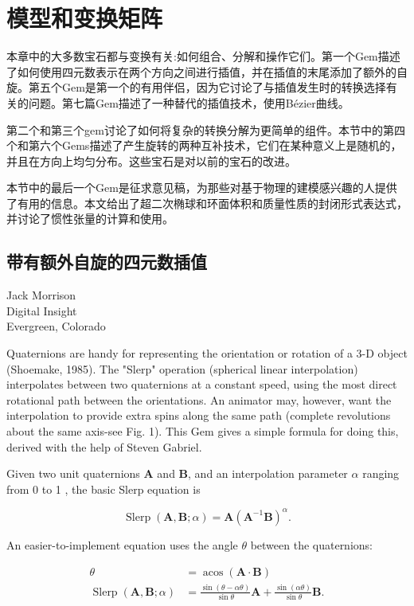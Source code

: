 \chapter{模型和变换矩阵}
本章中的大多数宝石都与变换有关:如何组合、分解和操作它们。第一个Gem描述了如何使用四元数表示在两个方向之间进行插值，并在插值的末尾添加了额外的自旋。第五个Gem是第一个的有用伴侣，因为它讨论了与插值发生时的转换选择有关的问题。第七篇Gem描述了一种替代的插值技术，使用B\'ezier曲线。

第二个和第三个gem讨论了如何将复杂的转换分解为更简单的组件。本节中的第四个和第六个Gems描述了产生旋转的两种互补技术，它们在某种意义上是随机的，并且在方向上均匀分布。这些宝石是对以前的宝石的改进。

本节中的最后一个Gem是征求意见稿，为那些对基于物理的建模感兴趣的人提供了有用的信息。本文给出了超二次椭球和环面体积和质量性质的封闭形式表达式，并讨论了惯性张量的计算和使用。

\newpage
\section{带有额外自旋的四元数插值}
\begin{center}
\small{
Jack Morrison\\
Digital Insight\\
Evergreen, Colorado}
\end{center}

Quaternions are handy for representing the orientation or rotation of a 3-D object (Shoemake, 1985). The "Slerp" operation (spherical linear interpolation) interpolates between two quaternions at a constant speed, using the most direct rotational path between the orientations. An animator may, however, want the interpolation to provide extra spins along the same path (complete revolutions about the same axis-see Fig. 1). This Gem gives a simple formula for doing this, derived with the help of Steven Gabriel.

Given two unit quaternions $\mathbf{A}$ and $\mathbf{B}$, and an interpolation parameter $\alpha$ ranging from 0 to 1 , the basic Slerp equation is

$$
\operatorname{Slerp}(\mathbf{A}, \mathbf{B} ; \alpha)=\mathbf{A}\left(\mathbf{A}^{-1} \mathbf{B}\right)^{\alpha} .
$$

An easier-to-implement equation uses the angle $\theta$ between the quaternions:

$$
\begin{aligned}
\theta &=\operatorname{acos}(\mathbf{A} \cdot \mathbf{B}) \\
\operatorname{Slerp}(\mathbf{A}, \mathbf{B} ; \alpha) &=\frac{\sin (\theta-\alpha \theta)}{\sin \theta} \mathbf{A}+\frac{\sin (\alpha \theta)}{\sin \theta} \mathbf{B} .
\end{aligned}
$$

